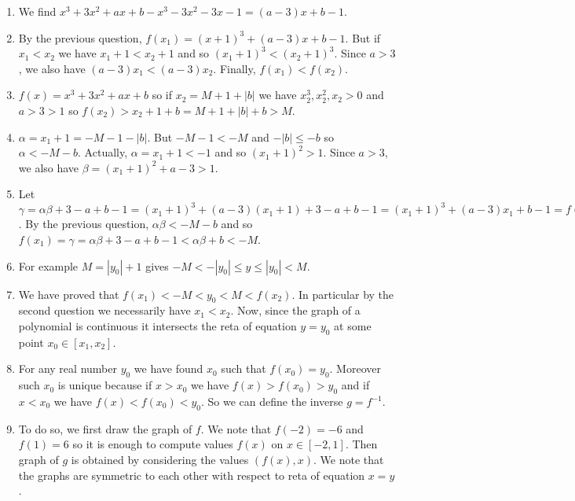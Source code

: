 \begin{enumerate}
\item We find $x^3 + 3x^2 + ax + b -x^3 -3x^2-3x-1 =
  {(a-3)}x + b-1$.
\item By the previous question,
  $f(x_1) = {(x+1)}^3 + {(a-3)}x + b-1$. But if
  $x_1 < x_2$ we have $x_1+1 < x_2+1$ and so ${(x_1+1)}^3 < {(x_2+1)}^3$.
  Since $a > 3$, we also have ${(a-3)}x_1 < {(a-3)}x_2$.
  Finally, $f(x_1) < f(x_2)$.
\item $f(x) = x^3 + 3x^2 + ax + b$ so if $x_2={M+1+|b|}$ we have
  $x_2^3, x_2^2, x_2 > 0$ and $a > 3 > 1$ so $f(x_2) >
  x_2+1+b = {M+1+|b|+b} > M$.
\item $\alpha = x_1+1={-M-1-|b|}$. But $-M-1<-M$ and $-|b| \leq -b$ so
  $\alpha < -M-b$. Actually, $\alpha=x_1+1 < -1$ and
  so ${(x_1+1)}^2 > 1$. Since $a > 3$, we also have
  $\beta = {(x_1+1)}^2 + a - 3 > 1$.
\item Let $\gamma=\alpha\beta+3-a+b-1=
  {(x_1+1)}^3 + {(a-3)}{(x_1+1)} + 3 -a + b-1 =
  {(x_1+1)}^3 + {(a-3)}x_1 + b-1 = f(x_1)$.
  By the previous question, $\alpha\beta < -M - b$ and
  so $f(x_1)=\gamma=\alpha\beta+3-a+b-1 < \alpha\beta+b< -M$.
\item For example $M=|y_0|+1$ gives $-M < -|y_0| \leq y \leq |y_0| < M$.
\item We have proved that $f(x_1) < -M < y_0 < M < f(x_2)$.
  In particular by the second question we necessarily have $x_1 < x_2$.
  Now, since the graph of a polynomial is continuous it intersects
  the reta of equation $y = y_0$ at some point $x_0 \in [x_1,x_2]$.
\item For any real number $y_0$ we have found $x_0$ such that $f(x_0) = y_0$.
  Moreover such $x_0$ is unique because if $x > x_0$ we have
  $f(x) > f(x_0) > y_0$ and if $x < x_0$ we have
  $f(x) < f(x_0) < y_0$. So we can define the inverse $g=f^{-1}$.
\item To do so, we first draw the graph of $f$.
  We note that $f(-2) = -6$ and $f(1) = 6$ so it is enough to compute values
  $f(x)$ on $x \in [-2,1]$. Then graph of $g$ is obtained by considering the
  values $(f(x), x)$. We note that the graphs are symmetric to each other
  with respect to reta of equation $x=y$.
  \begin{center}
\end{center}
\end{enumerate}
